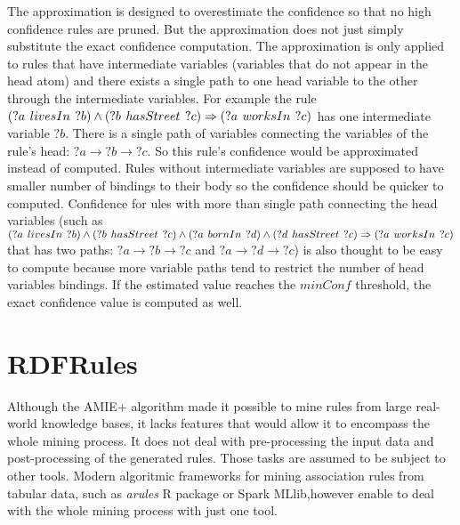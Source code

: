 The approximation is designed to overestimate the confidence so that no high confidence rules are pruned. But the approximation does not just simply substitute the exact confidence computation. The approximation is only applied to rules that have intermediate variables (variables that do not appear in the head atom) and there exists a single path to one head variable to the other through the intermediate variables. For example the rule $(?a\hspace{0.4em}livesIn\hspace{0.4em}?b) \land (?b\hspace{0.4em}hasStreet\hspace{0.4em}?c) \Rightarrow (?a\hspace{0.4em}worksIn\hspace{0.4em}?c)$ has one intermediate variable $?b$. There is a single path of variables connecting the variables of the rule's head: $?a \rightarrow ?b \rightarrow ?c$. So this rule's confidence would be approximated instead of computed. Rules without intermediate variables are supposed to have smaller number of bindings to their body so the confidence should be quicker to computed. Confidence for ules with more than single path connecting the head variables (such as $(?a\hspace{0.4em}livesIn\hspace{0.4em}?b) \land (?b\hspace{0.4em}hasStreet\hspace{0.4em}?c) \land (?a\hspace{0.4em}bornIn\hspace{0.4em}?d) \land (?d\hspace{0.4em}hasStreet\hspace{0.4em}?c)\Rightarrow (?a\hspace{0.4em}worksIn\hspace{0.4em}?c)$ that has two paths: $?a \rightarrow ?b \rightarrow ?c$ and $?a \rightarrow ?d \rightarrow ?c$) is also thought to be easy to compute because more variable paths tend to restrict the number of head variables bindings. If the estimated value reaches the $minConf$ threshold, the exact confidence value is computed as well.

\section{RDFRules}

Although the AMIE+ algorithm made it possible to mine rules from large real-world knowledge bases, it lacks features that would allow it to encompass the whole mining process. It does not deal with pre-processing the input data and post-processing of the generated rules. Those tasks are assumed to be subject to other tools. Modern algoritmic frameworks for mining association rules from tabular data, such as \textit{arules} R package or Spark MLlib,however enable to deal with the whole mining process with just one tool.

